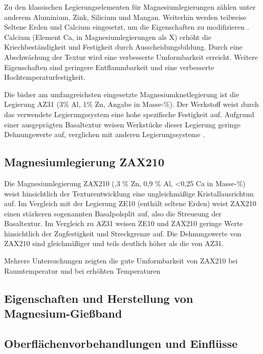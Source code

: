 Zu den klassischen Legierungselementen für Magnesiumlegierungen zählen unter anderem Aluminium, Zink, Silicium und Mangan.
Weiterhin werden teilweise Seltene Erden und Calcium eingesetzt, um die Eigenschaften zu modifizieren \cite{Rout.2020}.
Calcium (Element Ca, in Magnesiumlegierungen als X) erhöht die Kriechbeständigkeit und Festigkeit durch Ausscheidungsbildung.
Durch eine Abschwächung der Textur wird eine verbesserte Umformbarkeit erreicht.
Weitere Eigenschaften sind geringere Entflammbarkeit und eine verbesserte Hochtemperaturfestigkeit. \cite{Yi.2016}

Die bisher am umfangreichsten eingesetzte Magnesiumknetlegierung ist die Legierung AZ31 (3\% Al, 1\% Zn, Angabe in Masse-\%).
Der Werkstoff weist durch das verwendete Legierungssystem eine hohe spezifische Festigkeit auf. \cite{Droeder.1999}
Aufgrund einer ausgeprägten Basaltextur weisen Werkstücke dieser Legierung geringe Dehnungswerte auf, verglichen mit anderen Legierungssysteme \cite{Stutz.2015}.


\subsection{Magnesiumlegierung ZAX210}\label{sec:ZAX}

Die Magnesiumlegierung ZAX210 (,3 \% Zn, 0,9 \% Al, <0,25 Ca in Masse-\%) weist hinsichtlich der Texturentwicklung eine ungleichmäßige Kristallausrichtun auf.
Im Vergleich mit der Legierung ZE10 (enthält seltene Erden) weist ZAX210 einen stärkeren sogenannten Basalpolsplit auf, also die Streueung der Basaltextur.
Im Vergleich zu AZ31 weisen ZE10 und ZAX210 geringe Werte hinsichtlich der Zugfestigkeit und Streckgrenze auf.
Die Dehnungswerte von ZAX210 sind gleichmäßiger und teils deutlich höher als die von AZ31. \cite{Ullmann.2019}

Mehrere Untersuchungen zeigten die gute Umformbarkeit von ZAX210 bei Raumtemperatur und bei erhöhten Temperaturen \cite{}




\subsection{Eigenschaften und Herstellung von Magnesium-Gießband}

\subsection{Oberflächenvorbehandlungen und Einflüsse}\label{sec:Oberflächen}

